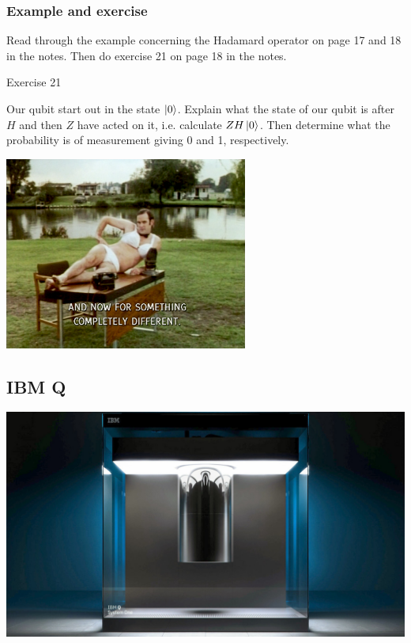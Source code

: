 \documentclass[10pt]{beamer}
\begin{document}
\begin{frame}
  \frametitle{Example and exercise}
  Read through the example concerning the Hadamard operator on page 17 and 18 in the notes.
  Then do exercise 21 on page 18 in the notes.

  \begin{block}{Exercise 21}
   \centerline{
} 

Our qubit start out in the state $\ket{0}$. Explain what the state of our qubit is after $H$ and then $Z$ have acted on it, i.e. calculate $ZH\ket{0}$. Then determine what the probability is of measurement giving 0 and 1, respectively.
  \end{block}
\end{frame}
\begin{frame}
  \centering
  \includegraphics[width=8cm]{img/completely-different.png}
\end{frame}
\begin{frame}
  \section{IBM Q}
  \centering
  \includegraphics[width=0.7\linewidth]{img/IBMQ.jpg}
\end{frame}
\end{document}
